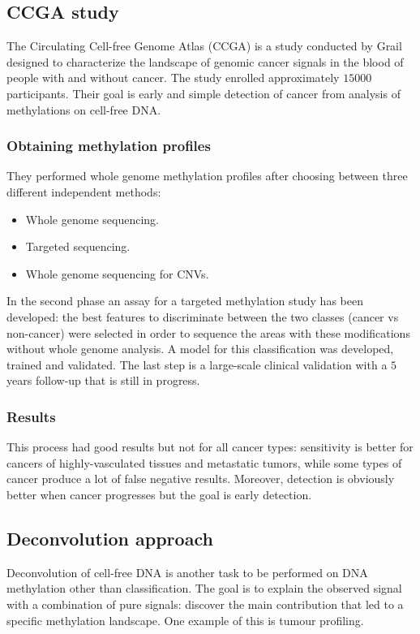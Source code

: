     \subsection{CCGA study}
    The Circulating Cell-free Genome Atlas (CCGA) is a study conducted by Grail designed to characterize the landscape of genomic cancer signals in the blood of people with and without cancer.
    The study enrolled approximately $15000$ participants.
    Their goal is early and simple detection of cancer from analysis of methylations on cell-free DNA.

        \subsubsection{Obtaining methylation profiles}
        They performed whole genome methylation profiles after choosing between three different independent methods:

        \begin{multicols}{2}
            \begin{itemize}
                \item Whole genome sequencing.
                \item Targeted sequencing.
                \item Whole genome sequencing for CNVs.
            \end{itemize}
        \end{multicols}

        In the second phase an assay for a targeted methylation study has been developed: the best features to discriminate between the two classes (cancer vs non-cancer) were selected in order to sequence the areas with these modifications without whole genome analysis.
        A model for this classification was developed, trained and validated.
        The last step is a large-scale clinical validation with a $5$ years follow-up that is still in progress.

        \subsubsection{Results}
        This process had good results but not for all cancer types: sensitivity is better for cancers of highly-vasculated tissues and metastatic tumors, while some types of cancer produce a lot of false negative results.
        Moreover, detection is obviously better when cancer progresses but the goal is early detection.

    \subsection{Deconvolution approach}
    Deconvolution of cell-free DNA is another task to be performed on DNA methylation other than classification.
    The goal is to explain the observed signal with a combination of pure signals: discover the main contribution that led to a specific methylation landscape.
    One example of this is tumour profiling.

